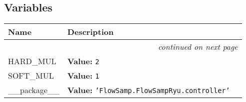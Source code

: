 
  \subsection{Variables}

    \vspace{-1cm}
\hspace{\varindent}\begin{longtable}{|p{\varnamewidth}|p{\vardescrwidth}|l}
\cline{1-2}
\cline{1-2} \centering \textbf{Name} & \centering \textbf{Description}& \\
\cline{1-2}
\endhead\cline{1-2}\multicolumn{3}{r}{\small\textit{continued on next page}}\\\endfoot\cline{1-2}
\endlastfoot\raggedright H\-A\-R\-D\-\_\-M\-U\-L\- & \raggedright \textbf{Value:} 
{\tt 2}&\\
\cline{1-2}
\raggedright S\-O\-F\-T\-\_\-M\-U\-L\- & \raggedright \textbf{Value:} 
{\tt 1}&\\
\cline{1-2}
\raggedright \_\-\_\-p\-a\-c\-k\-a\-g\-e\-\_\-\_\- & \raggedright \textbf{Value:} 
{\tt \texttt{'}\texttt{FlowSamp.FlowSampRyu.controller}\texttt{'}}&\\
\cline{1-2}
\end{longtable}

